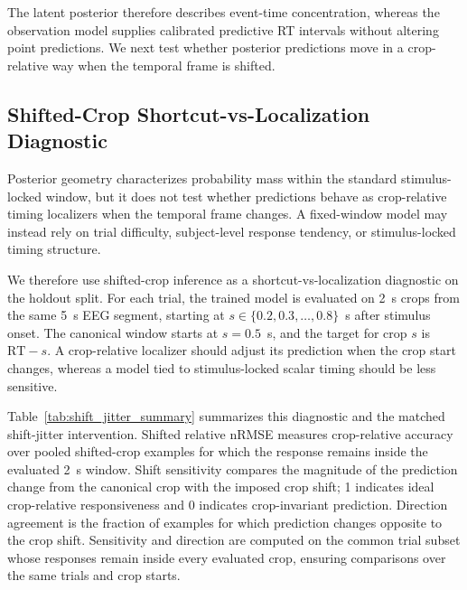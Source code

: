 \documentclass[12pt]{article}
\begin{document}
The latent posterior therefore describes event-time concentration, whereas the observation model supplies calibrated predictive RT intervals without altering point predictions. We next test whether posterior predictions move in a crop-relative way when the temporal frame is shifted.

\subsection{Shifted-Crop Shortcut-vs-Localization Diagnostic}
\label{sec:shifted_crop_diagnostic}

Posterior geometry characterizes probability mass within the standard stimulus-locked window, but it does not test whether predictions behave as crop-relative timing localizers when the temporal frame changes. A fixed-window model may instead rely on trial difficulty, subject-level response tendency, or stimulus-locked timing structure.

We therefore use shifted-crop inference as a shortcut-vs-localization diagnostic on the holdout split. For each trial, the trained model is evaluated on 2~s crops from the same 5~s EEG segment, starting at $s\in\{0.2,0.3,\dots,0.8\}$~s after stimulus onset. The canonical window starts at $s=0.5$~s, and the target for crop $s$ is $\mathrm{RT}-s$. A crop-relative localizer should adjust its prediction when the crop start changes, whereas a model tied to stimulus-locked scalar timing should be less sensitive.

Table~\ref{tab:shift_jitter_summary} summarizes this diagnostic and the matched shift-jitter intervention. Shifted relative nRMSE measures crop-relative accuracy over pooled shifted-crop examples for which the response remains inside the evaluated 2~s window. Shift sensitivity compares the magnitude of the prediction change from the canonical crop with the imposed crop shift; 1 indicates ideal crop-relative responsiveness and 0 indicates crop-invariant prediction. Direction agreement is the fraction of examples for which prediction changes opposite to the crop shift. Sensitivity and direction are computed on the common trial subset whose responses remain inside every evaluated crop, ensuring comparisons over the same trials and crop starts.
\end{document}
